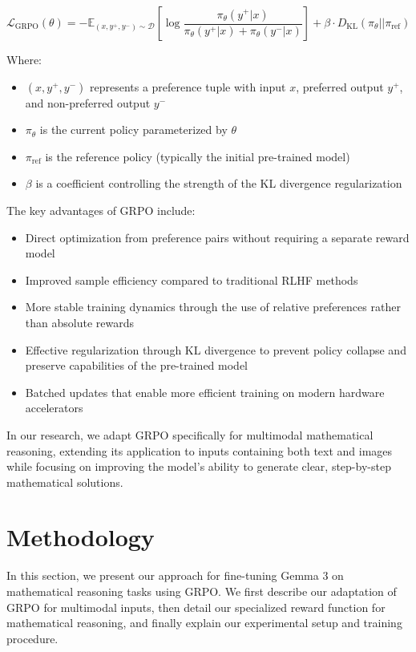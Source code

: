 \documentclass[11pt,a4paper]{article}
\begin{document}
\begin{equation}
\mathcal{L}_{\text{GRPO}}(\theta) = -\mathbb{E}_{(x, y^+, y^-) \sim \mathcal{D}} \left[ \log \frac{\pi_\theta(y^+ | x)}{\pi_\theta(y^+ | x) + \pi_\theta(y^- | x)} \right] + \beta \cdot D_{\text{KL}}(\pi_\theta || \pi_{\text{ref}})
\end{equation}

Where:
\begin{itemize}
    \item $(x, y^+, y^-)$ represents a preference tuple with input $x$, preferred output $y^+$, and non-preferred output $y^-$
    \item $\pi_\theta$ is the current policy parameterized by $\theta$
    \item $\pi_{\text{ref}}$ is the reference policy (typically the initial pre-trained model)
    \item $\beta$ is a coefficient controlling the strength of the KL divergence regularization
\end{itemize}

The key advantages of GRPO include:
\begin{itemize}
    \item Direct optimization from preference pairs without requiring a separate reward model
    \item Improved sample efficiency compared to traditional RLHF methods
    \item More stable training dynamics through the use of relative preferences rather than absolute rewards
    \item Effective regularization through KL divergence to prevent policy collapse and preserve capabilities of the pre-trained model
    \item Batched updates that enable more efficient training on modern hardware accelerators
\end{itemize}

In our research, we adapt GRPO specifically for multimodal mathematical reasoning, extending its application to inputs containing both text and images while focusing on improving the model's ability to generate clear, step-by-step mathematical solutions.

\section{Methodology}

In this section, we present our approach for fine-tuning Gemma 3 on mathematical reasoning tasks using GRPO. We first describe our adaptation of GRPO for multimodal inputs, then detail our specialized reward function for mathematical reasoning, and finally explain our experimental setup and training procedure.
\end{document}
